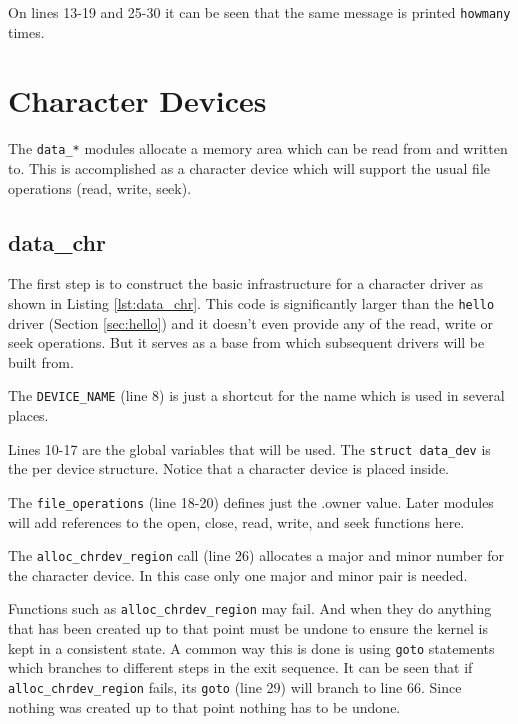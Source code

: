 \documentclass{article}
\begin{document}
On lines 13-19 and 25-30 it can be seen that the same message
is printed \verb+howmany+ times.

\clearpage
\section{Character Devices}

The \verb+data_*+ modules allocate a memory area
which can be read from and written to.
This is accomplished as a character device which will support
the usual file operations (read, write, seek).

\subsection{data\_chr}
\label{sec:data_chr}

The first step is to construct the basic infrastructure for
a character driver as shown in Listing \ref{lst:data_chr}.
This code is significantly larger than the
\verb+hello+ driver (Section \ref{sec:hello}) and it doesn't
even provide any of the read, write or seek operations.
But it serves as a base from which subsequent drivers will be built from.

The \verb+DEVICE_NAME+ (line 8) is just a shortcut for the
name which is used in several places.

Lines 10-17 are the global variables that will be used.
The \verb+struct data_dev+ is the per device structure.
Notice that a character device is placed inside.

The \verb+file_operations+ (line 18-20) defines just the .owner value.
Later modules will add references
to the open, close, read, write, and seek functions here.

The \verb+alloc_chrdev_region+ call (line 26) allocates a major
and minor number for the character device\autocite[Pg. 66]{corbet2009linux}.
In this case only one major and minor pair is needed.

Functions such as \verb+alloc_chrdev_region+ may fail.
And when they do anything that has been created up to that point must
be undone to ensure the kernel is kept in a consistent state.
A common way this is done is using \verb+goto+ statements which
branches to different steps in the exit
sequence\autocite[Pg. 53]{corbet2009linux}.
It can be seen that if \verb+alloc_chrdev_region+ fails, its \verb+goto+
(line 29) will branch to line 66.
Since nothing was created up to that point nothing has to be undone.
\end{document}
